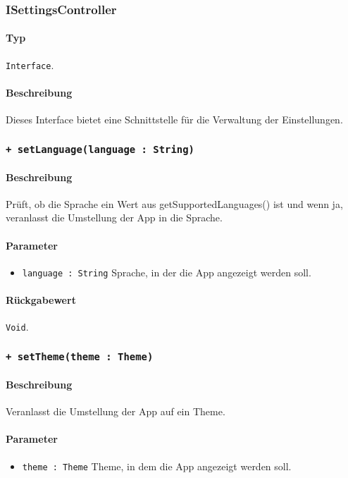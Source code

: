 \subsubsection{ISettingsController}\label{App_Settings_ISettingsController}
\paragraph*{Typ}
\texttt{Interface}.
\paragraph*{Beschreibung}
Dieses Interface bietet eine Schnittstelle für die Verwaltung der Einstellungen.

\subsubsection*{\texttt{+ setLanguage(language : String)}}\label{App_Settings_ISettingsController_setLanguage}%
\paragraph*{Beschreibung}
Prüft, ob die Sprache ein Wert aus getSupportedLanguages() ist und wenn ja, veranlasst die Umstellung der App in die Sprache.
\paragraph*{Parameter}
\begin{itemize}
    \item \texttt{language : String} Sprache, in der die App angezeigt werden soll.
\end{itemize}
\paragraph*{Rückgabewert}
\texttt{Void}.

\subsubsection*{\texttt{+ setTheme(theme : Theme)}}\label{App_Settings_ISettingsController_setTheme}%
\paragraph*{Beschreibung}
Veranlasst die Umstellung der App auf ein Theme.
\paragraph*{Parameter}
\begin{itemize}
    \item \texttt{theme : Theme} Theme, in dem die App angezeigt werden soll.
\end{itemize}

